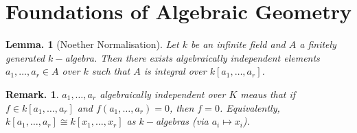 \documentclass[11pt, a4paper]{memoir}
\theoremstyle{change}
\newtheorem{lemma}[theorem]{Lemma.}
\theoremstyle{plain}
\theoremstyle{nonumberplain}
\newtheorem{remark}{Remark.}
\numberwithin{equation}{section}
\begin{document}
\section{Foundations of Algebraic Geometry}
\begin{lemma}[Noether Normalisation]
    Let $k$ be an infinite field and $A$ a finitely generated $k-$algebra.
    Then there exists algebraically independent elements $a_1,\ldots,a_r\in A$ over $k$ such that $A$ is integral over $k[a_1,\ldots,a_r]$.
\end{lemma}
\begin{remark}
    $a_1,\ldots,a_r$ algebraically independent over $K$ meaus that if $f\in k[a_1,\ldots,a_r]$ and $f(a_1,\ldots,a_r)=0$, then $f=0$.
    Equivalently, $k[a_1,\ldots,a_r]\cong k[x_1,\ldots,x_r]$ as $k-$algebras (via $a_i\mapsto x_i$).
\end{remark}
\end{document}
